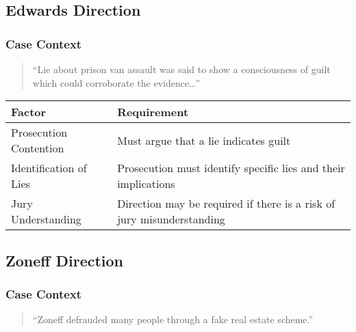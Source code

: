 \subsection{Edwards Direction}\label{edwards-direction}

\subsubsection{Case Context}\label{case-context}

\begin{quote}
``Lie about prison van assault was said to show a consciousness of guilt
which could corroborate the evidence\ldots''
\end{quote}

\begin{longtable}[]{@{}
  >{\raggedright\arraybackslash}p{}
  >{\raggedright\arraybackslash}p{}@{}}
\toprule\noalign{}
\begin{minipage}[b]{\linewidth}\raggedright
Factor
\end{minipage} & \begin{minipage}[b]{\linewidth}\raggedright
Requirement
\end{minipage} \\
\midrule\noalign{}
\endhead
\bottomrule\noalign{}
\endlastfoot
Prosecution Contention & Must argue that a lie indicates guilt \\
Identification of Lies & Prosecution must identify specific lies and
their implications \\
Jury Understanding & Direction may be required if there is a risk of
jury misunderstanding \\
\end{longtable}

\subsection{Zoneff Direction}\label{zoneff-direction}

\subsubsection{Case Context}\label{case-context-1}

\begin{quote}
``Zoneff defrauded many people through a fake real estate scheme.''
\end{quote}

